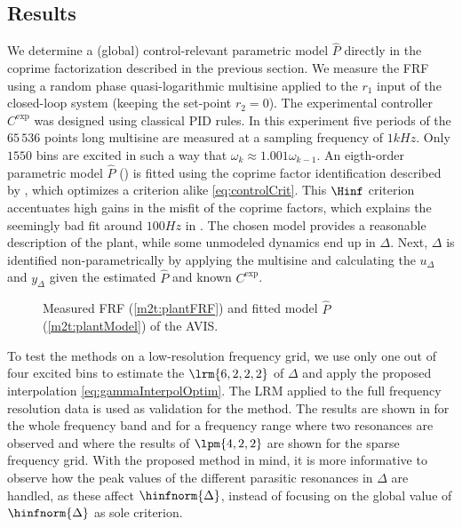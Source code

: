 \subsection{Results}
\label{sec:resultsAvis}
We determine a (global) control-relevant parametric model $\hat{P}$ directly in the coprime factorization described in the previous section. 
We measure the \gls{FRF} using a random phase quasi-logarithmic multisine \citep{Geerardyn2013TIM} applied to the $r_1$ input of the closed-loop system (keeping the set-point $r_2 =0$).
The experimental controller $C^{\mathrm{exp}}$ was designed using classical PID rules.
In this experiment five periods of the $65\,536$ points long multisine are measured at a sampling frequency of $1\unit{kHz}$.
Only $1550$ bins are excited in such a way that $\omega_k \approx 1.001 \omega_{k-1}$.
An eigth-order parametric model $\hat{P}$ () is fitted using the coprime factor identification described by \cite{Oomen2012SIRP}, which optimizes a criterion alike \eqref{eq:controlCrit}.
This $\Hinf$ criterion accentuates high gains in the misfit of the coprime factors, which explains the seemingly bad fit around $100 \unit{Hz}$ in .
The chosen model provides a reasonable description of the plant, while  some unmodeled dynamics end up in $\Delta$.
Next, $\Delta$ is identified non-parametrically by applying the multisine and calculating the $u_{\Delta}$ and $y_{\Delta}$ given the estimated $\hat{P}$ and known $C^{\mathrm{exp}}$.

\begin{figure}
 \centering
    \setlength{\figurewidth}{0.9\columnwidth}
    \setlength{\figureheight}{0.8\figurewidth}
    
 \caption{Measured \gls{FRF} (\ref{m2t:plantFRF}) and fitted model $\hat{P}$ (\ref{m2t:plantModel}) of the \gls{AVIS}.}
 \label{fig:avis-frf}
\end{figure}

To test the methods on a low-resolution frequency grid, we use only one out of four excited bins to estimate the $\lrm{6,2,2,2}$ of $\Delta$ and apply the proposed interpolation \eqref{eq:gammaInterpolOptim}.
The \gls{LRM} applied to the full frequency resolution data is used as validation for the method.
The results are shown in  for the whole frequency band and  for a frequency range where two resonances are observed and where the results of $\lpm{4,2,2}$ are shown for the sparse frequency grid.
With the proposed method in mind, it is more informative to observe how the peak values of the different parasitic resonances in $\Delta$ are handled, as these affect $\hinfnorm{\Delta}$, instead of focusing on the global value of $\hinfnorm{\Delta}$ as sole criterion.

